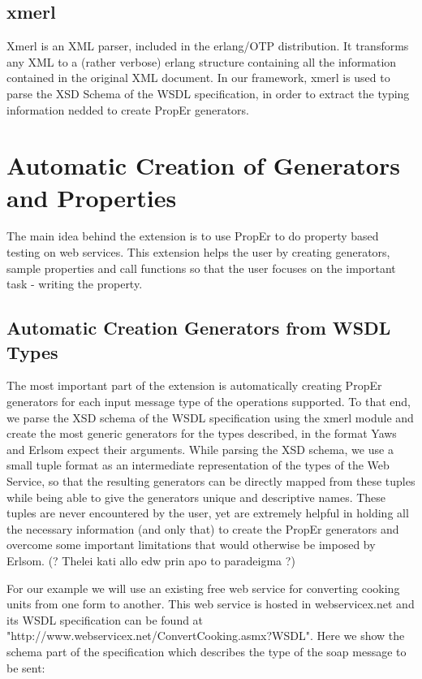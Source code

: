 \documentclass[submission,copyright,a4]{eptcs}
\begin{document}
\subsection{xmerl}

Xmerl is an XML parser, included in the erlang/OTP distribution. It transforms any XML to a (rather verbose) erlang structure containing all the information contained in the original XML document. In our framework, xmerl is used to parse the XSD Schema of the WSDL specification, in order to extract the typing information nedded to create PropEr generators.

\section{Automatic Creation of Generators and Properties}

The main idea behind the extension is to use PropEr to do property based testing on web services. This extension helps the user by creating generators, sample properties and call functions so that the user focuses on the important task - writing the property. 

\subsection{Automatic Creation Generators from WSDL Types}

The most important part of the extension is automatically creating PropEr generators for each input message type of the operations supported. To that end, we parse the XSD schema of the WSDL specification using the xmerl module and create the most generic generators for the types described, in the format Yaws and Erlsom expect their arguments. While parsing the XSD schema, we use a small tuple format as an intermediate representation of the types of the Web Service, so that the resulting generators can be directly mapped from these tuples while being able to give the generators unique and descriptive names. These tuples are never encountered by the user, yet are extremely helpful in holding all the necessary information (and only that) to create the PropEr generators and overcome some important limitations that would otherwise be imposed by Erlsom. (? Thelei kati allo edw prin apo to paradeigma ?)

For our example we will use an existing free web service for converting cooking units from one form to another. This web service is hosted in webservicex.net and its WSDL specification can be found at "http://www.webservicex.net/ConvertCooking.asmx?WSDL". Here we show the schema part of the specification which describes the type of the soap message to be sent:
\end{document}
